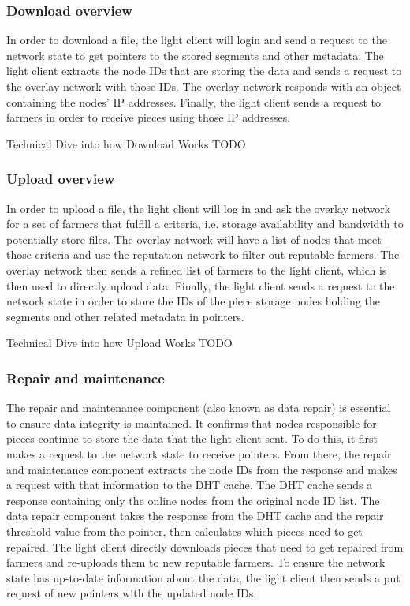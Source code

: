 \documentclass[a4paper,10pt]{article} \usepackage[utf8]{inputenc}
\newcommand{\todo}[1]{{\color{red} TODO #1}}
\begin{document}
\subsubsection{Download overview} In order to download a file, the light
client will login and send a request to the network state to get pointers to the
stored segments and other metadata. The light client extracts the node IDs that
are storing the data and sends a request to the overlay network with those IDs.
The overlay network responds with an object containing the nodes’ IP addresses.
Finally, the light client sends a request to farmers in order to receive pieces
using those IP addresses.


Technical Dive into how Download Works \todo{}

\subsubsection{Upload overview}
In order to upload a file, the light client will log in
and ask the overlay network for a set of farmers that fulfill a criteria, i.e.
storage availability and bandwidth to potentially store files. The overlay
network will have a list of nodes that meet those criteria and use the
reputation network to filter out reputable farmers. The overlay network then
sends a refined list of farmers to the light client, which is then used to
directly upload data. Finally, the light client sends a request to the network
state in order to store the IDs of the piece storage nodes holding the segments
and other related metadata in pointers.


Technical Dive into how Upload Works \todo{}

\subsubsection{Repair and maintenance}
The repair and maintenance component (also known as data
repair) is essential to ensure data integrity is maintained. It confirms that
nodes responsible for pieces continue to store the data that the light client
sent. To do this, it first makes a request to the network state to receive
pointers. From there, the repair and maintenance component extracts the node IDs
from the response and makes a request with that information to the DHT cache.
The DHT cache sends a response containing only the online nodes from the
original node ID list. The data repair component takes the response from the DHT
cache and the repair threshold value from the pointer, then calculates which
pieces need to get repaired. The light client directly downloads pieces that
need to get repaired from farmers and re-uploads them to new reputable farmers.
To ensure the network state has up-to-date information about the data, the light
client then sends a put request of new pointers with the updated node IDs.
\end{document}
